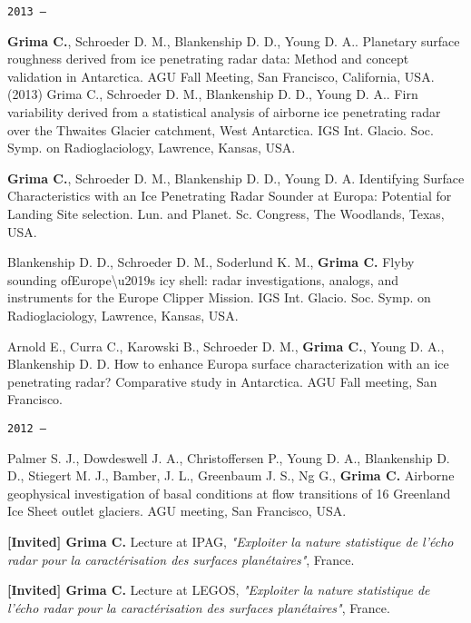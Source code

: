 \begin{etaremune}
\hspace{-2em}\texttt{2013 ---}

\item
  \textbf{Grima C.}, Schroeder D. M., Blankenship D. D., Young D. A..
  Planetary surface roughness derived from ice penetrating radar data:
  Method and concept validation in Antarctica. AGU Fall Meeting, San
  Francisco, California, USA. (2013) Grima C., Schroeder D. M.,
  Blankenship D. D., Young D. A.. Firn variability derived from a
  statistical analysis of airborne ice penetrating radar over the
  Thwaites Glacier catchment, West Antarctica. IGS Int. Glacio. Soc.
  Symp. on Radioglaciology, Lawrence, Kansas, USA.
\item
  \textbf{Grima C.}, Schroeder D. M., Blankenship D. D., Young D. A.
  Identifying Surface Characteristics with an Ice Penetrating Radar
  Sounder at Europa: Potential for Landing Site selection. Lun. and
  Planet. Sc. Congress, The Woodlands, Texas, USA.
\item
  Blankenship D. D., Schroeder D. M., Soderlund K. M., \textbf{Grima C.}
  Flyby sounding ofEurope\textbackslash{}u2019s icy shell: radar
  investigations, analogs, and instruments for the Europe Clipper
  Mission. IGS Int. Glacio. Soc. Symp. on Radioglaciology, Lawrence,
  Kansas, USA.
\item
  Arnold E., Curra C., Karowski B., Schroeder D. M., \textbf{Grima C.},
  Young D. A., Blankenship D. D. How to enhance Europa surface
  characterization with an ice penetrating radar? Comparative study in
  Antarctica. AGU Fall meeting, San Francisco.

\hspace{-2em}\texttt{2012 ---}

\item
  Palmer S. J., Dowdeswell J. A., Christoffersen P., Young D. A.,
  Blankenship D. D., Stiegert M. J., Bamber, J. L., Greenbaum J. S., Ng
  G., \textbf{Grima C.} Airborne geophysical investigation of basal
  conditions at flow transitions of 16 Greenland Ice Sheet outlet
  glaciers. AGU meeting, San Francisco, USA.
\item
  \textbf{{[}Invited{]} Grima C.} Lecture at IPAG, \emph{"Exploiter la
  nature statistique de l'écho radar pour la caractérisation des
  surfaces planétaires"}, France.
\item
  \textbf{{[}Invited{]} Grima C.} Lecture at LEGOS, \emph{"Exploiter la
  nature statistique de l'écho radar pour la caractérisation des
  surfaces planétaires"}, France.


\end{etaremune}
